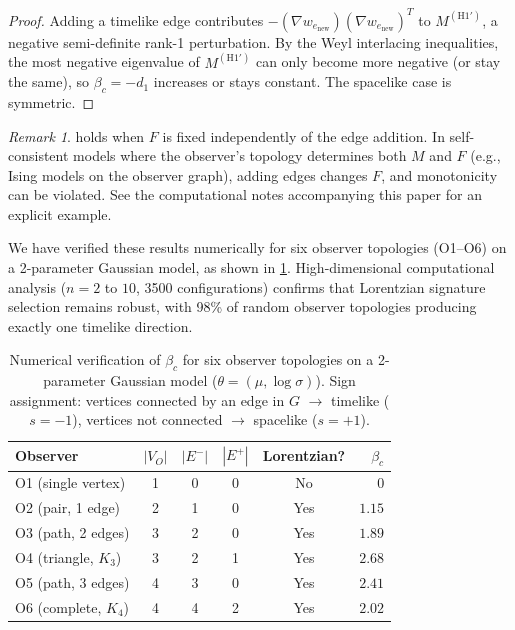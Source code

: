 \documentclass[11pt]{article}
\theoremstyle{definition}
\theoremstyle{remark}
\newtheorem{remark}[theorem]{Remark}
\begin{document}
\begin{proof}
Adding a timelike edge contributes $-(\nabla w_{e_{\mathrm{new}}})
(\nabla w_{e_{\mathrm{new}}})^T$ to $M^{(\mathrm{H1'})}$, a negative
semi-definite rank-1 perturbation.
By the Weyl interlacing inequalities, the most negative eigenvalue of
$M^{(\mathrm{H1'})}$ can only become more negative (or stay the same),
so $\beta_c = -d_1$ increases or stays constant.
The spacelike case is symmetric.
\end{proof}

\begin{remark}
 holds when $F$ is fixed independently
of the edge addition.
In self-consistent models where the observer's topology determines
both $M$ and $F$ (e.g., Ising models on the observer graph),
adding edges changes $F$, and monotonicity can be violated.
See the computational notes accompanying this paper for an explicit
example.
\end{remark}

We have verified these results numerically for six observer topologies
(O1--O6) on a 2-parameter Gaussian model, as shown in \cref{tab:observers}.
High-dimensional computational analysis ($n = 2$ to $10$, 3500 configurations)
confirms that Lorentzian signature selection remains robust, with 98\% of
random observer topologies producing exactly one timelike direction.

\begin{table}[ht]
\centering
\caption{Numerical verification of $\beta_c$ for six observer topologies
on a 2-parameter Gaussian model ($\theta = (\mu, \log\sigma)$).
Sign assignment: vertices connected by an edge in $G$ $\to$ timelike ($s = -1$),
vertices not connected $\to$ spacelike ($s = +1$).}
\label{tab:observers}
\begin{tabular}{@{}lccccr@{}}
\toprule
Observer & $|V_O|$ & $|E^-|$ & $|E^+|$ & Lorentzian? & $\beta_c$ \\
\midrule
O1 (single vertex)   & 1 & 0 & 0 & No  & $0$ \\
O2 (pair, 1 edge)    & 2 & 1 & 0 & Yes & $1.15$ \\
O3 (path, 2 edges)   & 3 & 2 & 0 & Yes & $1.89$ \\
O4 (triangle, $K_3$) & 3 & 2 & 1 & Yes & $2.68$ \\
O5 (path, 3 edges)   & 4 & 3 & 0 & Yes & $2.41$ \\
O6 (complete, $K_4$) & 4 & 4 & 2 & Yes & $2.02$ \\
\bottomrule
\end{tabular}
\end{table}
\end{document}
